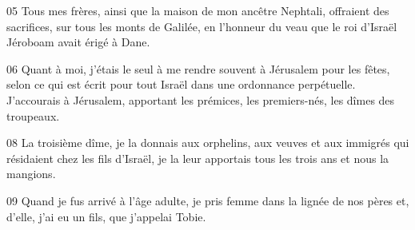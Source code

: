 
05 Tous mes frères, ainsi que la maison de mon ancêtre Nephtali, offraient des sacrifices, sur tous les monts de Galilée, en l’honneur du veau que le roi d’Israël Jéroboam avait érigé à Dane.

06 Quant à moi, j’étais le seul à me rendre souvent à Jérusalem pour les fêtes, selon ce qui est écrit pour tout Israël dans une ordonnance perpétuelle. J’accourais à Jérusalem, apportant les prémices, les premiers-nés, les dîmes des troupeaux.

08 La troisième dîme, je la donnais aux orphelins, aux veuves et aux immigrés qui résidaient chez les fils d’Israël, je la leur apportais tous les trois ans et nous la mangions.

09 Quand je fus arrivé à l’âge adulte, je pris femme dans la lignée de nos pères et, d’elle, j’ai eu un fils, que j’appelai Tobie.
